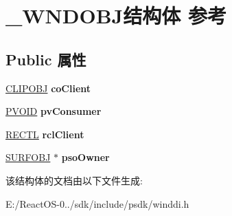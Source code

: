 \hypertarget{struct___w_n_d_o_b_j}{}\section{\+\_\+\+W\+N\+D\+O\+B\+J结构体 参考}
\label{struct___w_n_d_o_b_j}
\subsection*{Public 属性}
\begin{DoxyCompactItemize}
\item 
\mbox{\label{struct___w_n_d_o_b_j_a380f305326cf572877f5c2cbbf9597b1}} 
\hyperlink{struct___c_l_i_p_o_b_j}{C\+L\+I\+P\+O\+BJ} {\bfseries co\+Client}
\item 
\mbox{\label{struct___w_n_d_o_b_j_a15eaf1d02574d93584203a169c023cb4}} 
\hyperlink{interfacevoid}{P\+V\+O\+ID} {\bfseries pv\+Consumer}
\item 
\mbox{\label{struct___w_n_d_o_b_j_ab66620ba0b61463404f6e0280a25998c}} 
\hyperlink{struct___r_e_c_t_l}{R\+E\+C\+TL} {\bfseries rcl\+Client}
\item 
\mbox{\label{struct___w_n_d_o_b_j_aeed62e128e45db519a8e26f834f9c3ed}} 
\hyperlink{struct___s_u_r_f_o_b_j}{S\+U\+R\+F\+O\+BJ} $\ast$ {\bfseries pso\+Owner}
\end{DoxyCompactItemize}


该结构体的文档由以下文件生成\+:\begin{DoxyCompactItemize}
\item 
E\+:/\+React\+O\+S-\/0../sdk/include/psdk/winddi.\+h\end{DoxyCompactItemize}
